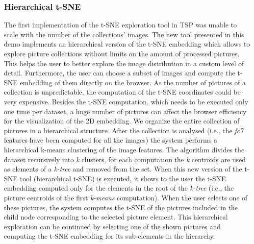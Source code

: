 \subsubsection{Hierarchical t-SNE}
The first implementation of the t-SNE exploration tool in TSP was unable to scale with the number of the collections' images. The new tool presented in this demo implements an hierarchical version of the t-SNE embedding which allows to explore picture collections without limits on the amount of processed pictures. 
This helps the user to better explore the image distribution in a custom level of detail. Furthermore, the user can choose a subset of images and compute the t-SNE embedding of them directly on the browser. %
As the number of pictures of a collection is unpredictable, the computation of the t-SNE coordinates could be very expensive. Besides the t-SNE computation, which needs to be executed only one time per dataset, a huge number of pictures can affect the browser efficiency for the visualization of the 2D embedding. We organize the entire collection of pictures in a hierarchical structure. After the collection is analysed (i.e., the \textit{fc7} features have been computed for all the images) the system performs a hierarchical k-means clustering of the image features. The algorithm divides the dataset recursively into \textit{k} clusters, for each computation the \textit{k} centroids are used as elements of a \textit{k-tree} and removed from the set. %
When this new version of the t-SNE tool (hierarchical t-SNE) is executed, it shows to the user the t-SNE embedding computed only for the elements in the root of the \textit{k-tree} (i.e., the picture centroids of the first \textit{k-means} computation). When the user selects one of these pictures, the system computes the t-SNE of the pictures included in the child node corresponding to the selected picture element. This hierarchical exploration can be continued by selecting one of the shown pictures and computing the t-SNE embedding for its sub-elements in the hierarchy.



